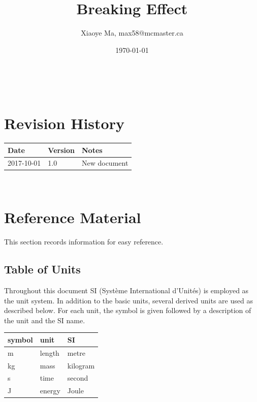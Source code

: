 \documentclass[12pt]{article}
\begin{document}
	
	\title{Breaking Effect} 
	\author{Xiaoye Ma, max58@mcmaster.ca}
	\date{\today}
	
	\maketitle
	
	~\newpage
	
	
	\section{Revision History}
	
	\begin{tabularx}{\textwidth}{p{3cm}p{2cm}X}
		\toprule {\bf Date} & {\bf Version} & {\bf Notes}\\
		\midrule
		2017-10-01 & 1.0 & New document\\
		\bottomrule
	\end{tabularx}
	
	~\newpage
	
	\section{Reference Material}
	
	This section records information for easy reference.
	
	\subsection{Table of Units}
	
	Throughout this document SI (Syst\`{e}me International d'Unit\'{e}s) is employed
	as the unit system.  In addition to the basic units, several derived units are
	used as described below.  For each unit, the symbol is given followed by a
	description of the unit and the SI name.
	~\newline
	
	\renewcommand{\arraystretch}{1.2}
	\noindent \begin{tabular}{l l l} 
		\toprule		
		\textbf{symbol} & \textbf{unit} & \textbf{SI}\\
		\midrule 
		\si{\metre} & length & metre\\
		\si{\kilogram} & mass	& kilogram\\
		\si{\second} & time & second\\
		\si{\joule} & energy & Joule\\
		\bottomrule
	\end{tabular}
	
\end{document}
